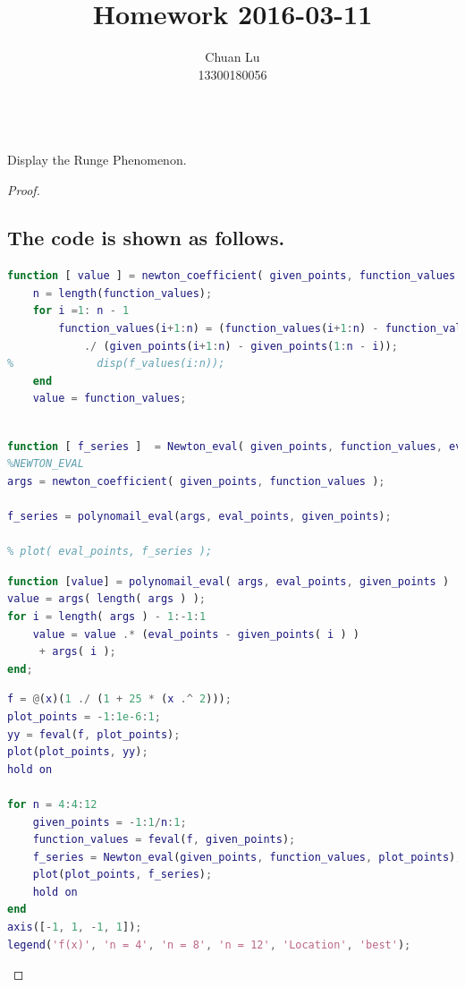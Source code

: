 \documentclass[48pt]{article}
\newenvironment{problem}[2][Problem]{\begin{trivlist}
\item[\hskip \labelsep {\bfseries #1}\hskip \labelsep {\bfseries #2.}]}{\end{trivlist}}
\begin{document}
\title{Homework 2016-03-11}
\author{Chuan Lu\\
13300180056}

\maketitle

\begin{problem}{1}
\text{ }\\
Display the Runge Phenomenon.
\end{problem}

\begin{proof}
\subsection{The code is shown as follows.}
\begin{lstlisting}[language={MATLAB}]
function [ value ] = newton_coefficient( given_points, function_values )
    n = length(function_values);
    for i =1: n - 1
    	function_values(i+1:n) = (function_values(i+1:n) - function_values(i:n - 1))
    		./ (given_points(i+1:n) - given_points(1:n - i));
%             disp(f_values(i:n));
    end
    value = function_values;
    
\end{lstlisting}

\begin{lstlisting}[language={MATLAB}]
function [ f_series ]  = Newton_eval( given_points, function_values, eval_points)
%NEWTON_EVAL  
args = newton_coefficient( given_points, function_values );

f_series = polynomail_eval(args, eval_points, given_points);

% plot( eval_points, f_series );
\end{lstlisting}

\begin{lstlisting}[language = {MATLAB}]
function [value] = polynomail_eval( args, eval_points, given_points )
value = args( length( args ) );
for i = length( args ) - 1:-1:1
    value = value .* (eval_points - given_points( i ) )
     + args( i );
end;
\end{lstlisting}

\begin{lstlisting}[language = {MATLAB}]
f = @(x)(1 ./ (1 + 25 * (x .^ 2)));
plot_points = -1:1e-6:1;
yy = feval(f, plot_points);
plot(plot_points, yy);
hold on

for n = 4:4:12
    given_points = -1:1/n:1;
    function_values = feval(f, given_points);
    f_series = Newton_eval(given_points, function_values, plot_points);
    plot(plot_points, f_series);
    hold on
end
axis([-1, 1, -1, 1]);
legend('f(x)', 'n = 4', 'n = 8', 'n = 12', 'Location', 'best');
\end{lstlisting}


\end{proof}
\end{document}
